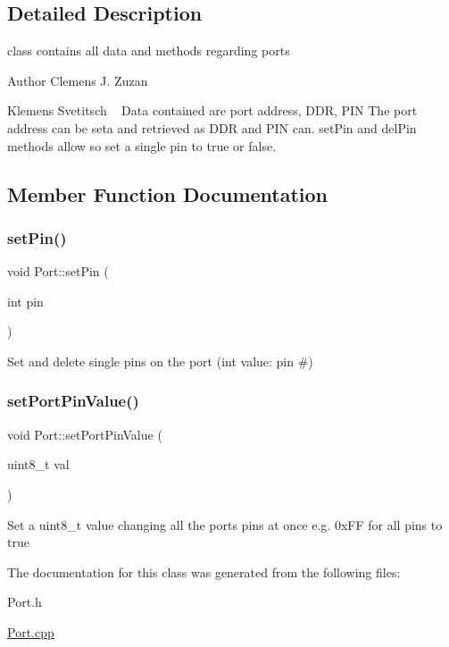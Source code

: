 \subsection{Detailed Description}
class contains all data and methods regarding ports 

\begin{DoxyAuthor}{Author}
Clemens J. Zuzan 

Klemens Svetitsch ~\newline
Data contained are port address, D\+DR, P\+IN The port address can be seta and retrieved as D\+DR and P\+IN can. set\+Pin and del\+Pin methods allow so set a single pin to true or false. 
\end{DoxyAuthor}


\subsection{Member Function Documentation}
\mbox{\label{class_port_a8fe1b4494cbebd660d2e0d306d375955}} 
\subsubsection{\texorpdfstring{set\+Pin()}{setPin()}}
{\footnotesize\ttfamily void Port\+::set\+Pin (\begin{DoxyParamCaption}\item[{int}]{pin }\end{DoxyParamCaption})}

Set and delete single pin\textquotesingle{}s on the port (int value\+: pin \#) \mbox{\label{class_port_a4bcf1fdd0aa8221dc05b3d2665ecd292}} 
\subsubsection{\texorpdfstring{set\+Port\+Pin\+Value()}{setPortPinValue()}}
{\footnotesize\ttfamily void Port\+::set\+Port\+Pin\+Value (\begin{DoxyParamCaption}\item[{uint8\+\_\+t}]{val }\end{DoxyParamCaption})\hspace{0.3cm}{\ttfamily [inline]}}

Set a uint8\+\_\+t value changing all the port\textquotesingle{}s pins at once e.\+g. 0x\+FF for all pins to true 

The documentation for this class was generated from the following files\+:\begin{DoxyCompactItemize}
\item 
Port.\+h\item 
\mbox{\hyperlink{_port_8cpp}{Port.\+cpp}}\end{DoxyCompactItemize}
